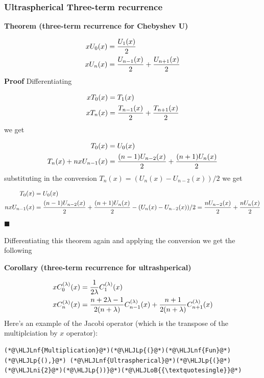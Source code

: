 \documentclass[12pt,a4paper]{article}
\newcommand{\HLJLnf}[1]{\textcolor[RGB]{66,102,213}{#1}}
\newcommand{\HLJLni}[1]{\textcolor[RGB]{59,151,46}{#1}}
\newcommand{\HLJLoB}[1]{\textcolor[RGB]{102,102,102}{\textbf{#1}}}
\newcommand{\HLJLp}[1]{#1}
\begin{document}
\subsubsection{Ultraspherical Three-term recurrence}
\textbf{Theorem (three-term recurrence for Chebyshev U)} 


\begin{align*}
x U_0(x) &= {U_1(x) \over 2} \\
x U_n(x) &= {U_{n-1}(x) \over 2} + {U_{n+1}(x) \over 2}
\end{align*}
\textbf{Proof} Differentiating


\begin{align*}
 x T_0(x) &= T_1(x) \\
x T_n(x)  &=  {T_{n-1}(x) \over 2} + {T_{n+1}(x) \over 2}
\end{align*}
we get


\begin{align*}
  T_0(x) &= U_0(x) \\
 T_n(x) + n x U_{n-1}(x)  &=  {(n-1) U_{n-2}(x) \over 2} + {(n+1) U_n(x) \over 2}
\end{align*}
substituting in the conversion $T_n(x) = (U_n(x) - U_{n-2}(x))/2$ we get


\begin{align*}
  T_0(x) &= U_0(x) \\
 n x U_{n-1}(x)  &=  {(n-1) U_{n-2}(x) \over 2} + {(n+1) U_n(x) \over 2} - (U_n(x) - U_{n-2}(x))/2 = {n U_{n-2}(x) \over 2} + {n U_n(x) \over 2}
\end{align*}
\ensuremath{\blacksquare}

Differentiating this theorem again and applying the conversion we get the following

\textbf{Corollary (three-term recurrence for ultrashperical)}


\begin{align*}
x C_0^{(\lambda)}(x) &= {1 \over 2\lambda } C_1^{(\lambda)}(x) \\
 x C_n^{(\lambda)}(x) &=  {n+2\lambda-1 \over 2(n+\lambda)} C_{n-1}^{(\lambda)}(x) + {n+1 \over 2(n+\lambda)} C_{n+1}^{(\lambda)}(x) 
\end{align*}
Here's an example of the Jacobi operator (which is the transpose of the multiplciation by $x$ operator):


\begin{lstlisting}
(*@\HLJLnf{Multiplication}@*)(*@\HLJLp{(}@*)(*@\HLJLnf{Fun}@*)(*@\HLJLp{(),}@*) (*@\HLJLnf{Ultraspherical}@*)(*@\HLJLp{(}@*)(*@\HLJLni{2}@*)(*@\HLJLp{))}@*)(*@\HLJLoB{{\textquotesingle}}@*)
\end{lstlisting}
\end{document}
